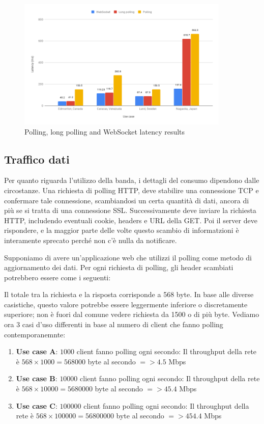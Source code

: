 \documentclass[12pt,a4paper,openright,twoside]{report}
\begin{document}
\begin{figure}[htbp]
\centering
\includegraphics[width=0.9\textwidth]{assets/latency_chart.png}
\caption{Polling, long polling and WebSocket latency results}
\label{fig:latency_chart}
\end{figure}

\subsection{Traffico dati}

Per quanto riguarda l'utilizzo della banda, i dettagli del consumo dipendono dalle circostanze. Una richiesta di polling HTTP, deve stabilire una connessione TCP e confermare tale connessione, scambiandosi un certa quantità di dati, ancora di più se si tratta di una connessione SSL. Successivamente deve inviare la richiesta HTTP, includendo eventuali cookie, headers e URL della GET. Poi il server deve rispondere, e la maggior parte delle volte questo scambio di informatzioni è interamente sprecato perché non c'è nulla da notificare.

\bigskip

Supponiamo di avere un'applicazione web che utilizzi il polling come metodo di aggiornamento dei dati. Per ogni richiesta di polling, gli header scambiati potrebbero essere come i seguenti:

Il totale tra la richiesta e la risposta corrisponde a 568 byte. In base alle diverse casistiche, questo valore potrebbe essere leggermente inferiore o discretamente superiore; non è fuori dal comune vedere richiesta da 1500 o di più byte.
Vediamo ora 3 casi d'uso differenti in base al numero di client che fanno polling contemporanemnte:
\begin{enumerate}
\item \textbf{Use case A}: $1000$ client fanno polling ogni secondo: Il throughput della rete è $568 \times 1000 = 568000$ byte al secondo $=> 4.5$ Mbps
\item \textbf{Use case B}: $10000$ client fanno polling ogni secondo: Il throughput della rete è $568 \times 10000 = 5680000$ byte al secondo $=> 45.4$ Mbps
\item \textbf{Use case C}: $100000$ client fanno polling ogni secondo: Il throughput della rete è $568 \times 100000 = 56800000$ byte al secondo $=> 454.4$ Mbps
\end{enumerate}
\end{document}
